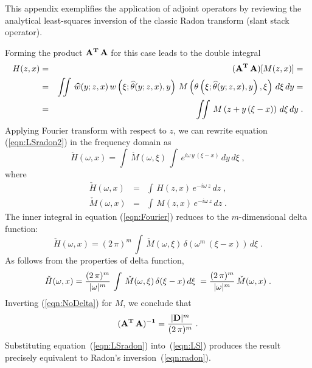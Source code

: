 


This appendix exemplifies the application of adjoint operators by
reviewing the analytical least-squares inversion of the classic Radon
transform (slant stack operator).

Forming the product ${\bf A^{T}\,A}$ for this case leads
to the double integral
\begin{eqnarray}
H(z,x) & = & {\bf (A^{T}\,A)}[M(z,x)] = 
\nonumber \\
& = & \iint\,\widehat{w}(y;z,x)\,
w\left(\xi;\widehat{\theta}(y;z,x),y\right)\,
M\left(\theta\left(\xi;\widehat{\theta}(y;z,x),y\right),\xi\right)\,
d\xi\,dy =
\nonumber \\
& = & \iint\,M\left(z + y\,(\xi - x)\right)\,d\xi\,dy\;.
\label{eqn:LSradon2}
\end{eqnarray}
Applying Fourier transform with respect to $z$, we can rewrite
equation (\ref{eqn:LSradon2}) in the frequency domain as
\begin{equation}
\check{H}(\omega,x) = \int\,\check{M}(\omega,\xi)\,\int\,
e^{i\omega\,y\,(\xi-x)}\,dy\,d\xi\;,
\label{eqn:Fourier}
\end{equation}
where
\begin{eqnarray}
\check{H}(\omega,x) & = & \int\,H(z,x)\,e^{-i\omega\,z}\,dz\;,
 \\
\check{M}(\omega,x) & = & \int\,M(z,x)\,e^{-i\omega\,z}\,dz\;.
\end{eqnarray}
The inner integral in equation (\ref{eqn:Fourier}) reduces to the $m$-dimensional
delta function:
\begin{equation}
\check{H}(\omega,x) = (2\,\pi)^m\,\int\,\check{M}(\omega,\xi)\,
\delta\left(\omega^m\,(\xi-x)\right)\,d\xi\;.
\end{equation}
As follows from the properties of delta function,
\begin{equation}
\check{H}(\omega,x) = {{(2\,\pi)^m} \over {|\omega|^m}}\,
\int\,\check{M}(\omega,\xi)\,
\delta(\xi-x)\,d\xi\; = {{(2\,\pi)^m} \over {|\omega|^m}}\,
\check{M}(\omega,x)\;.
\label{eqn:NoDelta}
\end{equation}
Inverting (\ref{eqn:NoDelta}) for $M$, we conclude that
\begin{equation}
{\bf (A^{T}\,A)^{-1}} = {{|{\bf D}|^m} \over {(2\,\pi)^m}}\;.
\label{eqn:LSradon}
\end{equation}
Substituting equation~(\ref{eqn:LSradon}) into~(\ref{eqn:LS}) produces
the result precisely equivalent to Radon's
inversion~(\ref{eqn:radon}).


